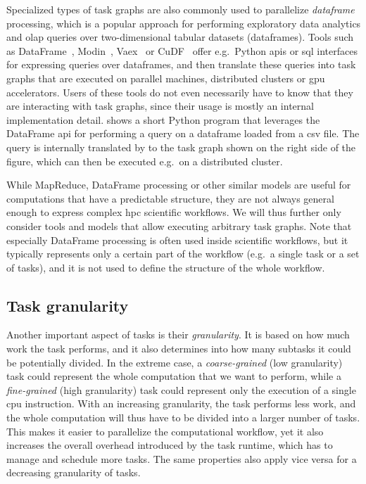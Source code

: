 Specialized types of task graphs are also commonly used to parallelize \emph{dataframe}
processing, which is a popular approach for performing exploratory data analytics and
\gls{olap} queries over two-dimensional tabular datasets (dataframes). Tools such
as \dask{} DataFrame~\cite{dask},
Modin~\cite{modin}, Vaex~\cite{vaex} or
CuDF~\cite{cudf} offer e.g.\ Python \glspl{api} or
\gls{sql} interfaces for expressing queries over dataframes, and then translate
these queries into task graphs that are executed on parallel machines, distributed clusters or
\gls{gpu} accelerators. Users of these tools do not even necessarily have to know
that they are interacting with task graphs, since their usage is mostly an internal implementation
detail.  shows a short Python program that leverages the
\dask{} DataFrame \gls{api} for performing a query on a
dataframe loaded from a \gls{csv} file. The query is internally translated by
\dask{} to the task graph shown on the right side of the figure, which can then
be executed e.g.\ on a distributed cluster.

While MapReduce, DataFrame processing or other similar models are useful for computations that have
a predictable structure, they are not always general enough to express complex
\gls{hpc} scientific workflows. We will thus further only consider tools and
models that allow executing arbitrary task graphs. Note that especially DataFrame processing is
often used inside scientific workflows, but it typically represents only a certain part of the
workflow (e.g.\ a single task or a set of tasks), and it is not used to define the structure of the
whole workflow.

\subsection*{Task granularity}
Another important aspect of tasks is their \emph{granularity}. It is based on how much
work the task performs, and it also determines into how many subtasks it could be potentially
divided. In the extreme case, a \emph{coarse-grained} (low granularity) task could represent the whole
computation that we want to perform, while a \emph{fine-grained} (high granularity) task could represent only
the execution of a single \gls{cpu} instruction. With an increasing granularity,
the task performs less work, and the whole computation will thus have to be divided into a larger
number of tasks. This makes it easier to parallelize the computational workflow, yet it also
increases the overall overhead introduced by the task runtime, which has to manage and schedule
more tasks. The same properties also apply vice versa for a decreasing granularity of tasks.


